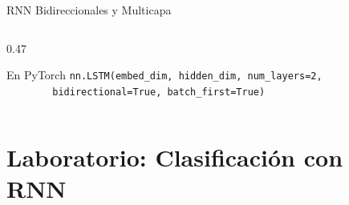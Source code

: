 \documentclass[aspectratio=169, 10pt]{beamer}
\begin{document}
\begin{frame}{RNN Bidireccionales y Multicapa}
\begin{columns}[T]
\begin{column}{0.47\textwidth}
			\begin{block}{En PyTorch}
				\scriptsize
				\texttt{nn.LSTM(embed\_dim, hidden\_dim, num\_layers=2,}\\
				\texttt{\ \ \ \ \ \ \ \ bidirectional=True, batch\_first=True)}
			\end{block}
		\end{column}
	\end{columns}

\end{frame}

\section{Laboratorio: Clasificaci\'on con RNN}
\end{document}
